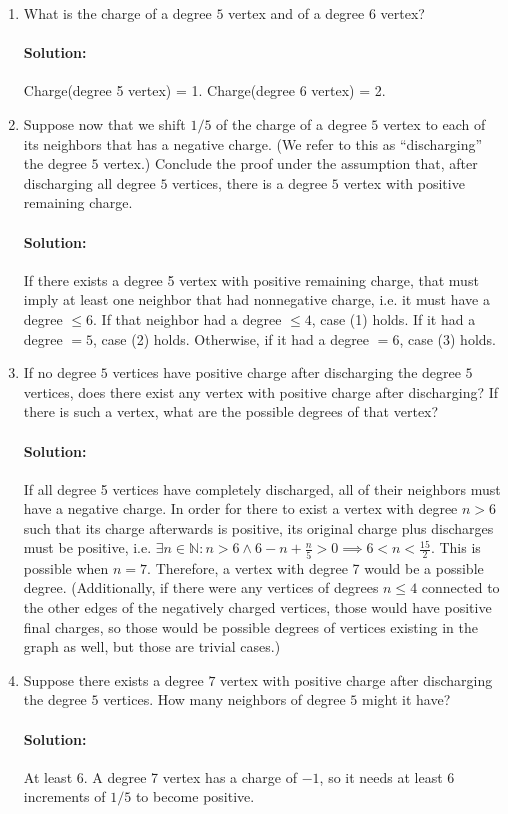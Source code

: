 \documentclass[11pt, notitlepage]{report}
\newcommand{\N}{\mathbb{N}}
\newenvironment{solution}{\paragraph{Solution:}}{\hfill}
\begin{document}
\begin{enumerate}[label=(\alph*)]
\item What is the charge of a degree $5$ vertex and of a degree $6$ vertex?
\begin{solution}
	Charge(degree 5 vertex) = 1. Charge(degree 6 vertex) = 2.
\end{solution}
\item Suppose now that we shift $1/5$ of the charge of a degree $5$ vertex to each of its neighbors that has a negative charge.  (We refer to this as ``discharging'' the degree $5$ vertex.)  Conclude the proof under the assumption that, after discharging all degree $5$ vertices, there is a degree $5$ vertex with positive remaining charge.
\begin{solution}
	If there exists a degree 5 vertex with positive remaining charge, that must imply at least one neighbor that had nonnegative charge, i.e. it must have a degree $\leq 6$. If that neighbor had a degree $\leq 4$, case (1) holds. If it had a degree $= 5$, case (2) holds. Otherwise, if it had a degree $= 6$, case (3) holds.
\end{solution}
\newpage
\item If no degree $5$ vertices have positive charge after discharging the degree $5$ vertices, 
does there exist any vertex with positive charge after discharging?
If there is such a vertex, what are the possible degrees of that vertex?
\begin{solution}
	If all degree 5 vertices have completely discharged, all of their neighbors must have a negative charge. In order for there to exist a vertex with degree $n>6$ such that its charge afterwards is positive, its original charge plus discharges must be positive, i.e.  $\exists n\in \N: n>6 \land 6-n+\frac{n}{5}>0  \implies 6<n<\frac{15}{2}.$ This is possible when $n=7$. Therefore, a vertex with degree 7 would be a possible degree. (Additionally, if there were any vertices of degrees $n\leq 4$ connected to the other edges of the negatively charged vertices, those would have positive final charges, so those would be possible degrees of vertices existing in the graph as well, but those are trivial cases.)
\end{solution}
\item 
Suppose there exists a degree $7$ vertex with positive charge after discharging the degree $5$ vertices.
How many neighbors of degree $5$ might it have?
\begin{solution}
	At least 6. A degree 7 vertex has a charge of $-1$, so it needs at least 6 increments of $1/5$ to become positive.
\end{solution}


\end{enumerate}
\end{document}
